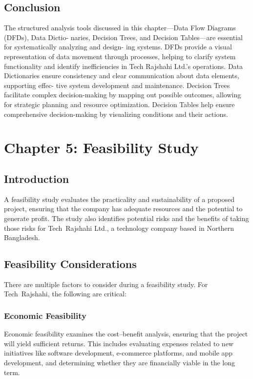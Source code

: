 \documentclass[12pt,a4paper]{article}
\begin{document}
\subsection{Conclusion}
The structured analysis tools discussed in this chapter—Data Flow Diagrams (DFDs), Data Dictio-
naries, Decision Trees, and Decision Tables—are essential for systematically analyzing and design-
ing systems. DFDs provide a visual representation of data movement through processes, helping
to clarify system functionality and identify inefficiencies in Tech Rajshahi Ltd.’s operations. Data
Dictionaries ensure consistency and clear communication about data elements, supporting effec-
tive system development and maintenance. Decision Trees facilitate complex decision-making by
mapping out possible outcomes, allowing for strategic planning and resource optimization.
Decision Tables help ensure comprehensive decision-making by visualizing conditions and their actions.

\newpage
\section{Chapter 5: Feasibility Study}

\subsection{Introduction}
A feasibility study evaluates the practicality and sustainability of a proposed project, ensuring that the company has adequate resources and the potential to generate profit.  The study also identifies potential risks and the benefits of taking those risks for Tech Rajshahi Ltd., a technology company based in Northern Bangladesh.

\subsection{Feasibility Considerations}
There are multiple factors to consider during a feasibility study.  For Tech Rajshahi, the following are critical:

\subsubsection{Economic Feasibility}
Economic feasibility examines the cost–benefit analysis, ensuring that the project will yield sufficient returns.  This includes evaluating expenses related to new initiatives like software development, e‑commerce platforms, and mobile app development, and determining whether they are financially viable in the long term.
\end{document}
